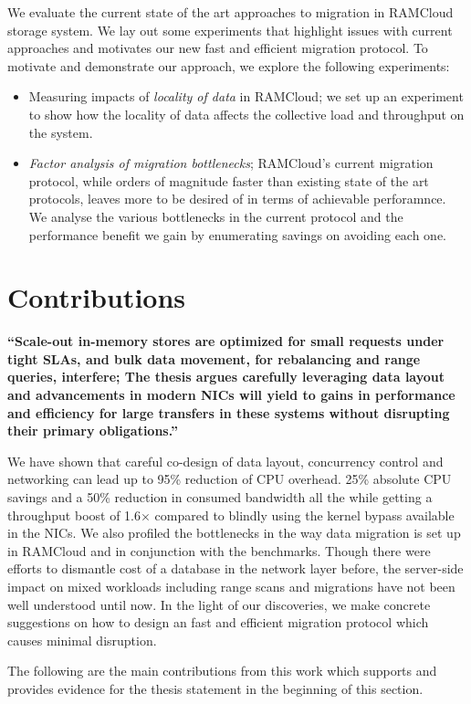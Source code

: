 We evaluate the current state of the art approaches to migration in RAMCloud storage system.
We lay out some experiments that highlight issues with current approaches and motivates our new 
fast and efficient migration protocol. To motivate and demonstrate our approach, we explore
the following experiments:
\begin{itemize}
\item Measuring impacts of {\em locality of data} in RAMCloud; we set up an experiment to show how 
the locality of data affects the collective load and throughput on the system.
\item {\em Factor analysis of migration bottlenecks}; RAMCloud's current migration protocol, while orders 
of magnitude faster than existing state of the art protocols, leaves more to be desired of in terms of achievable perforamnce.
We analyse the various bottlenecks in the current protocol and the performance benefit we gain by enumerating savings on avoiding 
each one.
\end{itemize} 

\section{Contributions}
\label{sec:contributions}
\textbf{\enquote{Scale-out in-memory stores are optimized for small requests
under tight SLAs, and bulk data movement, for rebalancing and range queries, interfere;
The thesis argues carefully leveraging data layout and advancements in modern NICs
will yield to gains in performance and efficiency for large transfers in these systems
without disrupting their primary obligations.}}
 
We have shown that careful co-design of data layout, concurrency control
and networking can lead up to 95\% reduction of CPU overhead. 25\% absolute CPU savings and a 
50\% reduction in consumed bandwidth all the while getting a throughput
boost of 1.6$\times$ compared to blindly using the kernel bypass available
in the NICs. We also profiled the bottlenecks in the way data migration is set up
in RAMCloud and in conjunction with the benchmarks. Though there were efforts to 
dismantle cost of a database in the network layer before, the server-side impact
on mixed workloads including range scans and migrations have not been well understood
until now. In the light of our discoveries, we make concrete suggestions on how
 to design an fast and efficient migration protocol which causes minimal disruption.

The following are the main contributions from this work which supports and provides
evidence for the thesis statement in the beginning of this section.

